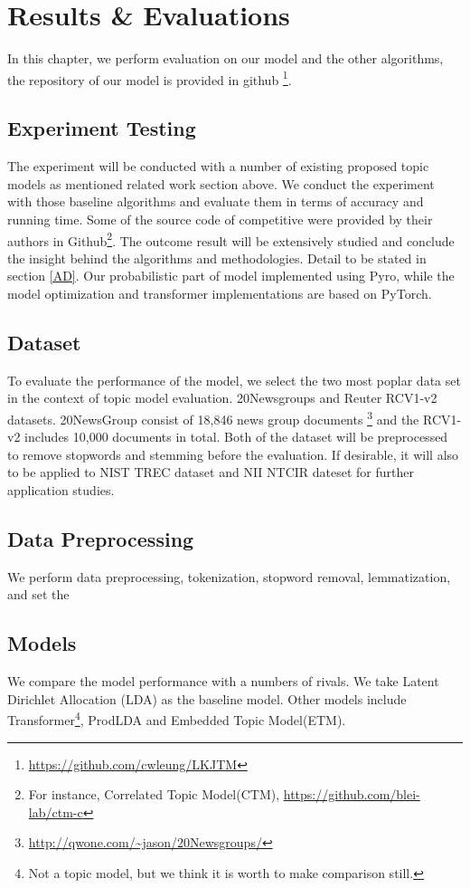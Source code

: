 \section{Results \& Evaluations}
In this chapter, we perform evaluation on our model and the other algorithms, the repository of our model is provided in github \footnote{\url{https://github.com/cwleung/LKJTM}}.
\subsection{Experiment Testing}
The experiment will be conducted with a number of existing proposed topic models as mentioned related work section above. We conduct the experiment with those baseline algorithms and evaluate them in terms of accuracy and running time. Some of the source code of competitive were provided by their authors in Github\footnote{For instance, Correlated Topic Model(CTM), \href{https://github.com/blei-lab/ctm-c}{https://github.com/blei-lab/ctm-c}}. The outcome result will be extensively studied and conclude the insight behind the algorithms and methodologies. Detail to be stated in section \ref{AD}. Our probabilistic part of model implemented using Pyro\cite{bingham_pyro_2019}, while the model optimization and transformer implementations are based on PyTorch\cite{paszke_automatic_2017}.
\subsection{Dataset}To evaluate the performance of the model, we select the two most poplar data set in the context of topic model evaluation. 20Newsgroups and Reuter RCV1-v2 datasets. 20NewsGroup consist of 18,846 news group documents \footnote{\url{http://qwone.com/~jason/20Newsgroups/}} and the RCV1-v2 includes 10,000 documents in total. Both of the dataset will be preprocessed to remove stopwords and stemming before the evaluation. If desirable, it will also to be applied to NIST TREC dataset and NII NTCIR dateset for further application studies.
\subsection{Data Preprocessing}
We perform data preprocessing, tokenization, stopword removal, lemmatization, and set the 
\subsection{Models}
We compare the model performance with a numbers of rivals. We take Latent Dirichlet Allocation (LDA)\cite{blei_latent_2003} as the baseline model. Other models include Transformer\cite{vaswani_attention_nodate}\footnote{Not a topic model, but we think it is worth to make comparison still.},  ProdLDA\cite{srivastava_autoencoding_2017} and Embedded Topic Model(ETM)\cite{dieng_topic_2019}.
